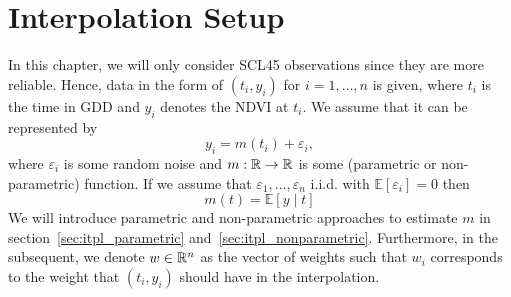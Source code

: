 \section{Interpolation Setup}{\label{sec:itpl_setup}
	In this chapter, we will only consider SCL45 observations since they are more reliable. Hence, data in the form of $\left(t_{i}, y_{i}\right)$ for $i=1, \ldots, n$ is given, where $t_i$ is the time in GDD and $y_i$ denotes the NDVI at $t_i$. We assume that it can be represented by
	$$
		y_{i}=m\left(t_{i}\right)+\varepsilon_{i},
	$$
	where $\varepsilon_i$ is some random noise and $m: \mathbb{R} \rightarrow \mathbb{R}$ is some (parametric or non-parametric) function. If we assume that $\varepsilon_{1}, \ldots, \varepsilon_{n}$ i.i.d. with $\mathbb{E}\left[\varepsilon_{i}\right]=0$ then 
	$$
		m(t)=\mathbb{E}[y \mid t]
	$$
	We will introduce parametric and non-parametric approaches to estimate $m$ in section~\ref{sec:itpl_parametric} and~\ref{sec:itpl_nonparametric}.
	Furthermore, in the subsequent, we denote $w\in \mathbb{R}^n$ as the vector of weights such that $w_i$ corresponds to the weight that $(t_i, y_i)$ should have in the interpolation. 
}







